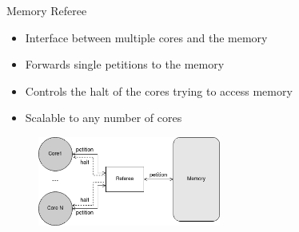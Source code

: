
\begin{frame}{Memory Referee}
\begin{itemize}
    \item Interface between multiple cores and the memory
    \item Forwards single petitions to the memory
    \item Controls the halt of the cores trying to access memory
    \item Scalable to any number of cores
\end{itemize}
\begin{figure}
    \centering
    \includegraphics[width=6cm]{images/Referee_fig.png}
    \label{fig:my_label}
\end{figure}
\end{frame}

